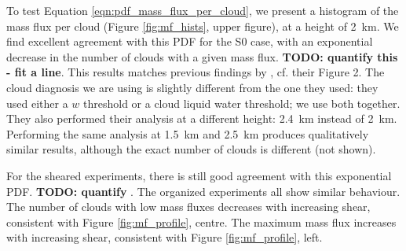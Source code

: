 \documentclass[11pt,a4paper]{article}
\newcommand\todo[1]{\textbf{TODO: #1}}
\begin{document}
%
To test Equation \ref{eqn:pdf_mass_flux_per_cloud}, we present a histogram of the mass flux per cloud (Figure \ref{fig:mf_hists}, upper figure), at a height of \SI{2}{km}. We find excellent agreement with this PDF for the S0 case, with an exponential decrease in the number of clouds with a given mass flux. \todo{quantify this - fit a line}. This results matches previous findings by \cite{CC2006II}, cf. their Figure 2. The cloud diagnosis we are using is slightly different from the one they used: they used either a $w$ threshold or a cloud liquid water threshold; we use both together. They also performed their analysis at a different height: \SI{2.4}{km} instead of \SI{2}{km}. Performing the same analysis at \SI{1.5}{km} and \SI{2.5}{km} produces qualitatively similar results, although the exact number of clouds is different (not shown).

For the sheared experiments, there is still good agreement with this exponential PDF. \todo{quantify} . The organized experiments all show similar behaviour. The number of clouds with low mass fluxes decreases with increasing shear, consistent with Figure \ref{fig:mf_profile}, centre. The maximum mass flux increases with increasing shear, consistent with Figure \ref{fig:mf_profile}, left.
\end{document}
